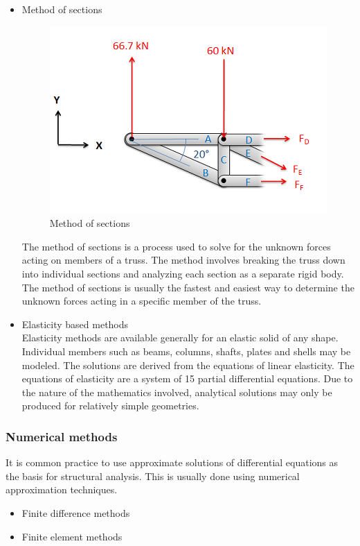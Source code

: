 \documentclass[12pt]{article}
\begin{document}
\begin{itemize}
    \item Method of sections\\
    \begin{figure}[H]
        \centering
        \includegraphics{images/sectionsMethod.png}
        \caption{Method of sections}
        \label{fig:sectionsMethod}
    \end{figure}
    The method of sections is a process used to solve for the unknown forces acting on members of a truss. The method involves breaking the truss down into individual sections and analyzing each section as a separate rigid body. The method of sections is usually the fastest and easiest way to determine the unknown forces acting in a specific member of the truss.\cite{adaptive-map}
    \item Elasticity based methods\\
    Elasticity methods are available generally for an elastic solid of any shape. Individual members such as beams, columns, shafts, plates and shells may be modeled. The solutions are derived from the equations of linear elasticity. The equations of elasticity are a system of 15 partial differential equations. Due to the nature of the mathematics involved, analytical solutions may only be produced for relatively simple geometries.\cite{wiki-structures}
    
\end{itemize}

\subsubsection{Numerical methods}
It is common practice to use approximate solutions of differential equations as the basis for structural analysis. This is usually done using numerical approximation techniques.
\begin{itemize}
    \item Finite difference methods
    \item Finite element methods
\end{itemize}
\end{document}

